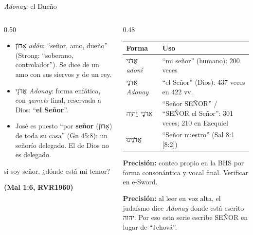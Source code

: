 \documentclass[hyperref={bookmarks=false},aspectratio=169]{beamer}
\newcommand{\heb}[1]{\mbox{\foreignlanguage{hebrew}{#1}}}
\newcommand{\SENOR}{S{\fontsize{0.78em}{1em}\selectfont EÑOR}}
\newcommand{\fuente}[1]{\par\hfill{\upshape\bfseries\footnotesize\textcolor{azul}{#1}}}
\newcommand{\destacar}[1]{\textbf{\textcolor{azul}{#1}}}
\newcommand{\precision}[1]{{\footnotesize\color{gris}\textbf{Precisión:} #1}}
\begin{document}
\begin{frame}{\emph{Adonay}: el Dueño}
\begin{columns}[t,onlytextwidth]
\begin{column}{0.50\textwidth}\footnotesize
\begin{itemize}
\item \heb{אָדוֹן} \emph{adón}: ``señor, amo, dueño'' (Strong: ``soberano, controlador''). Se dice de un amo con sus siervos y de un rey.
\item \heb{אֲדֹנָי} \emph{Adonay}: forma enfática, con \emph{qamets} final, reservada a Dios: ``\destacar{el Señor}''.
\item José es puesto ``por \destacar{señor} (\heb{אָדוֹן}) de toda su casa'' (Gn 45:8): un señorío delegado. El de Dios no es delegado.
\end{itemize}
\begin{cita}si soy señor, ¿dónde está mi temor?\fuente{(Mal 1:6, RVR1960)}\end{cita}
\end{column}
\begin{column}{0.48\textwidth}
\scriptsize\renewcommand{\arraystretch}{1.15}
\begin{tabular}{@{}>{\RaggedRight\arraybackslash}p{2.2cm}>{\RaggedRight\arraybackslash}p{3.6cm}@{}}
\toprule
\textbf{Forma} & \textbf{Uso} \\ \midrule
\heb{אֲדֹנִי} \emph{adoní} & ``mi señor'' (humano): 200 veces \\
\heb{אֲדֹנָי} \emph{Adonay} & ``el Señor'' (Dios): 437 veces en 422 vv. \\
\heb{אֲדֹנָי יֱהוִה} & ``Señor \SENOR'' / ``\SENOR{} el Señor'': 301 veces; 210 en Ezequiel \\
\heb{אֲדֹנֵינוּ} & ``Señor nuestro'' (Sal 8:1 [8:2]) \\
\bottomrule
\end{tabular}\par\smallskip
\precision{conteo propio en la BHS por forma consonántica y vocal final. Verificar en e-Sword.}\par\smallskip
\precision{al leer en voz alta, el judaísmo dice \emph{Adonay} donde está escrito \heb{יהוה}. Por eso esta serie escribe \SENOR{} en lugar de ``Jehová''.}
\end{column}
\end{columns}
\end{frame}
\end{document}
